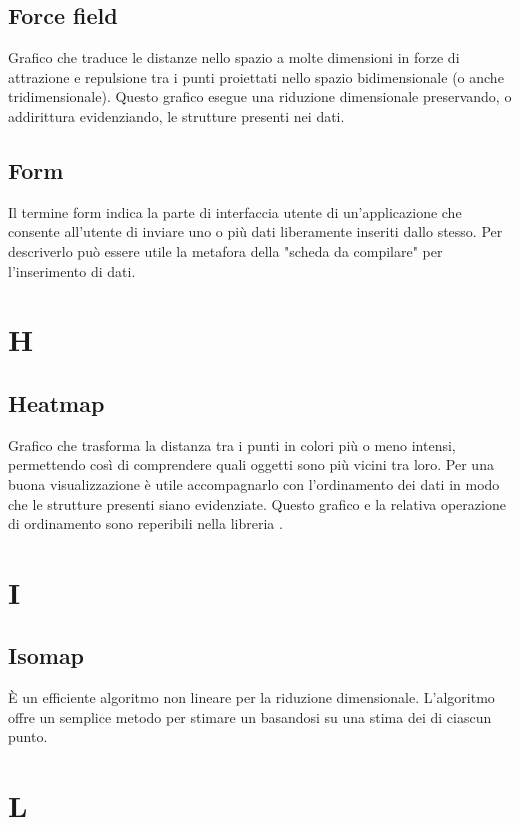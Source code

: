 \subsection*{Force field}
Grafico che traduce le distanze nello spazio a molte dimensioni in forze di attrazione e repulsione tra i punti proiettati nello spazio bidimensionale (o anche tridimensionale). Questo grafico esegue una riduzione dimensionale preservando, o addirittura evidenziando, le strutture presenti nei dati.

\subsection*{Form}
Il termine form indica la parte di interfaccia utente di un'applicazione che consente all'utente di inviare uno o più dati liberamente inseriti dallo stesso. Per descriverlo può essere utile la metafora della "scheda da compilare" per l'inserimento di dati. 

\section*{H}

\subsection*{Heatmap}
Grafico che trasforma la distanza tra i punti in colori più o meno intensi, permettendo così di comprendere quali oggetti sono più vicini tra loro. Per una buona visualizzazione è utile accompagnarlo con l'ordinamento dei dati in modo che le strutture presenti siano evidenziate. Questo grafico e la relativa operazione di ordinamento sono reperibili nella libreria .

\section*{I}

\subsection*{Isomap}
È un efficiente algoritmo non lineare per la riduzione dimensionale. L'algoritmo offre un semplice metodo per stimare un  basandosi su una stima dei  di ciascun punto.

\section*{L}

